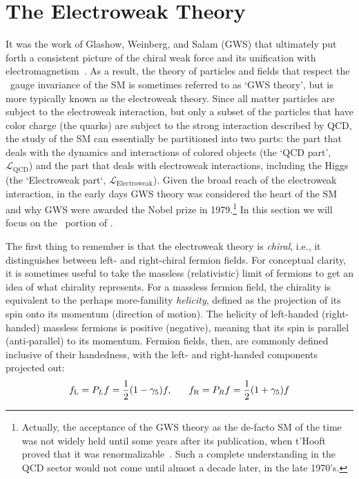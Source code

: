 \section{The Electroweak Theory}
\label{sec:ewk_description}

It was the work of Glashow, Weinberg, and Salam (GWS) that ultimately put forth a
consistent picture of the chiral weak force and
its unification with electromagnetism~\cite{Glashow:1961tr,Weinberg:1967tq,Salam:1968rm}.
As a result, the theory of particles and fields that respect the \SUewk~gauge
invariance of the SM is sometimes referred to as `GWS theory', 
but is more typically known as the electroweak theory. Since all matter particles
are subject to the electroweak interaction, but only a subset of the particles  that
have color charge (the quarks) are subject to the strong interaction described by QCD, the study of the SM can essentially
be partitioned into two parts: the part that deals with the dynamics and interactions of
colored objects (the `QCD part', $\mathcal{L}_{\text{QCD}}$) and the part that deals with electroweak
interactions, including the Higgs (the `Electroweak part`, $\mathcal{L}_{\text{Electroweak}}$).
Given the broad reach of the electroweak interaction,
in the early days GWS theory was considered the heart of the SM and why
GWS were awarded the Nobel prize in 1979.\footnote{Actually, the acceptance of the GWS theory as the
de-facto SM of the time was not widely held until some years after its publication, when t'Hooft
proved that it was renormalizable~\cite{tHooft:1971akt,tHooft:1971qjg}.
Such a complete understanding in the QCD sector would not come until almost a decade later, in the late
1970's{\color{red}{Woijkec etc CITE}}.}
In this section we will focus on the \SUewk~portion of \SML.

The first thing to remember is that the electroweak theory is \textit{chiral}, i.e., it distinguishes
between left- and right-chiral fermion fields.
For conceptual clarity, it is sometimes useful to take the massless (relativistic) limit of fermions to
get an idea of what chirality represents.
For a massless fermion field, the chirality is equivalent to the perhaps more-famility \textit{helicity},
defined as the projection of its spin onto its momentum (direction of motion).
The helicity of left-handed (right-handed) massless fermions is positive (negative), meaning
that its spin is parallel (anti-parallel) to its momentum.
Fermion fields, then, are commonly defined inclusive of their handedness, with the left-
and right-handed components projected out:
\begin{equation}
	f_{\text{L}} = P_L f = \frac{1}{2}(1- \gamma_5)f, \hspace{0.6cm} f_{\text{R}} = P_R f = \frac{1}{2}(1+\gamma_5)f
	\label{eq:chiral_projection}
\end{equation}

